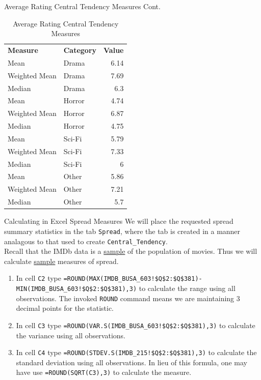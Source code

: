 \documentclass[pdf]{beamer}
\theoremstyle{remark}
\theoremstyle{definition}
\begin{document}
\begin{frame}[t]{Average Rating Central Tendency Measures Cont.}
\begin{table}[htbp]
  \centering
  \captionsetup{justification=centering}
    \begin{tabular}{llr}
    \rowcolor[rgb]{ .851,  .882,  .949} \textbf{Measure} & \textbf{Category} & \multicolumn{1}{l}{\textbf{Value}} \\
    Mean  & Drama & 6.14 \\
    Weighted Mean & Drama & 7.69 \\
    Median & Drama & 6.3 \\
    Mean  & Horror & 4.74 \\
    Weighted Mean & Horror & 6.87 \\
    Median & Horror & 4.75 \\
    Mean  & Sci-Fi & 5.79 \\
    Weighted Mean & Sci-Fi & 7.33 \\
    Median & Sci-Fi & 6 \\
    Mean  & Other & 5.86 \\
    Weighted Mean & Other & 7.21 \\
    Median & Other & 5.7 \\
    \end{tabular}%
    \caption{Average Rating Central Tendency Measures}
  \label{tab:arctm2}%
\end{table}%
\vspace{-2.0ex}

\end{frame}

\begin{frame}[t]{Calculating in Excel Spread Measures}
 We will place the requested spread summary statistics in the tab \texttt{Spread}, where the tab is created in a manner analagous to that used to create \texttt{Central\_Tendency}.\\
\vspace{1.5ex}
Recall that the IMDb data is a \underline{sample} of the population of movies.  Thus we will calculate \underline{sample} measures of spread.\\
\small
\begin{enumerate}
\item In cell \texttt{C2} type \texttt{=ROUND(MAX(IMDB\_BUSA\_603!\$Q\$2:\$Q\$381)- \\ MIN(IMDB\_BUSA\_603!\$Q\$2:\$Q\$381),3)} to calculate the range using all observations. The invoked \texttt{ROUND} command means we are maintaining  3 decimal points for the statistic.  
\item In cell \texttt{C3} type \texttt{=ROUND(VAR.S(IMDB\_BUSA\_603!\$Q\$2:\$Q\$381),3)} to calculate the variance using all observations.  
\item In cell \texttt{C4} type \texttt{=ROUND(STDEV.S(IMDB\_215!\$Q\$2:\$Q\$381),3)} to calculate the standard deviation using all observations.  In lieu of this formula, one may have use \texttt{=ROUND(SQRT(C3),3)} to calculate the measure. 
\end{enumerate}
\end{frame}
\end{document}
